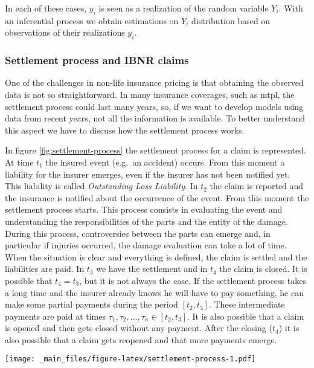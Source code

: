 \documentclass[a4paper, twoside, openright, 12pt]{report}
\let\origfigure\figure
\let\endorigfigure\endfigure
\renewenvironment{figure}[1][2] {
  \expandafter\origfigure\expandafter[!hbtp]
} {
  \endorigfigure
}
\theoremstyle{definition}
\theoremstyle{definition}
\theoremstyle{definition}
\theoremstyle{remark}
\begin{document}
In each of these cases, \(y_i\) is seen as a realization of the random variable \(Y_i\). With an inferential process we obtain estimations on \(Y_i\) distribution based on observations of their realizations \(y_i\).

\hypertarget{settlement-process-and-ibnr-claims}{%
\subsubsection{Settlement process and IBNR claims}\label{settlement-process-and-ibnr-claims}}

One of the challenges in non-life insurance pricing is that obtaining the observed data is not so straightforward. In many insurance coverages, such as \ac{mtpl}, the settlement process could last many years, so, if we want to develop models using data from recent years, not all the information is available. To better understand this aspect we have to discuss how the settlement process works.

In figure \ref{fig:settlement-process} the settlement process for a claim is represented. At time \(t_1\) the insured event (e.g.~an accident) occurs. From this moment a liability for the insurer emerges, even if the insurer has not been notified yet. This liability is called \emph{Outstanding Loss Liability}. In \(t_2\) the claim is reported and the insurance is notified about the occurrence of the event. From this moment the settlement process starts. This process consists in evaluating the event and understanding the responsibilities of the parts and the entity of the damage. During this process, controversies between the parts can emerge and, in particular if injuries occurred, the damage evaluation can take a lot of time. When the situation is clear and everything is defined, the claim is settled and the liabilities are paid. In \(t_3\) we have the settlement and in \(t_4\) the claim is closed. It is possible that \(t_4=t_3\), but it is not always the case. If the settlement process takes a long time and the insurer already knows he will have to pay something, he can make some partial payments during the period \([t_2, t_3]\). These intermediate payments are paid at times \(\tau_1, \tau_2, \dots, \tau_n \in [t_2, t_3]\). It is also possible that a claim is opened and then gets closed without any payment. After the closing (\(t_4\)) it is also possible that a claim gets reopened and that more payments emerge.

\begin{figure}
\centering
\texttt{[image: \_main\_files/figure-latex/settlement-process-1.pdf]}
\caption{\label{fig:settlement-process}Claim timeline.}
\end{figure}
\end{document}
